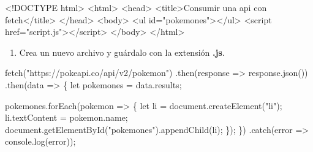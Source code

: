 \documentclass[
  a4paper,
  DIV=11,
  numbers=noendperiod,
  onepage,
  openany]{scrreprt}
\newenvironment{Shaded}{\begin{snugshade}}{\end{snugshade}}
\newcommand{\AttributeTok}[1]{\textcolor[rgb]{0.40,0.45,0.13}{#1}}
\newcommand{\BuiltInTok}[1]{\textcolor[rgb]{0.00,0.23,0.31}{#1}}
\newcommand{\DataTypeTok}[1]{\textcolor[rgb]{0.68,0.00,0.00}{#1}}
\newcommand{\FunctionTok}[1]{\textcolor[rgb]{0.28,0.35,0.67}{#1}}
\newcommand{\KeywordTok}[1]{\textcolor[rgb]{0.00,0.23,0.31}{#1}}
\newcommand{\NormalTok}[1]{\textcolor[rgb]{0.00,0.23,0.31}{#1}}
\newcommand{\OperatorTok}[1]{\textcolor[rgb]{0.37,0.37,0.37}{#1}}
\newcommand{\OtherTok}[1]{\textcolor[rgb]{0.00,0.23,0.31}{#1}}
\newcommand{\StringTok}[1]{\textcolor[rgb]{0.13,0.47,0.30}{#1}}
\providecommand{\tightlist}{%
  \setlength{\itemsep}{0pt}\setlength{\parskip}{0pt}}\usepackage{longtable,booktabs,array}
\begin{document}
\begin{Shaded}
\begin{Highlighting}[]
\DataTypeTok{\textless{}!DOCTYPE }\NormalTok{html}\DataTypeTok{\textgreater{}}
\DataTypeTok{\textless{}}\KeywordTok{html}\DataTypeTok{\textgreater{}}
\DataTypeTok{\textless{}}\KeywordTok{head}\DataTypeTok{\textgreater{}}
    \DataTypeTok{\textless{}}\KeywordTok{title}\DataTypeTok{\textgreater{}}\NormalTok{Consumir una api con fetch}\DataTypeTok{\textless{}/}\KeywordTok{title}\DataTypeTok{\textgreater{}}
\DataTypeTok{\textless{}/}\KeywordTok{head}\DataTypeTok{\textgreater{}}
\DataTypeTok{\textless{}}\KeywordTok{body}\DataTypeTok{\textgreater{}}
    \DataTypeTok{\textless{}}\KeywordTok{ul}\OtherTok{ id}\OperatorTok{=}\StringTok{"pokemones"}\DataTypeTok{\textgreater{}\textless{}/}\KeywordTok{ul}\DataTypeTok{\textgreater{}}
    \DataTypeTok{\textless{}}\KeywordTok{script}\OtherTok{ href}\OperatorTok{=}\StringTok{"script.js"}\DataTypeTok{\textgreater{}\textless{}/}\KeywordTok{script}\DataTypeTok{\textgreater{}}
\DataTypeTok{\textless{}/}\KeywordTok{body}\DataTypeTok{\textgreater{}}
\DataTypeTok{\textless{}/}\KeywordTok{html}\DataTypeTok{\textgreater{}}
\end{Highlighting}
\end{Shaded}

\begin{enumerate}
\def\labelenumi{\arabic{enumi}.}
\setcounter{enumi}{3}
\tightlist
\item
  Crea un nuevo archivo y guárdalo con la extensión \textbf{.js}.
\end{enumerate}

\begin{Shaded}
\begin{Highlighting}[]
\FunctionTok{fetch}\NormalTok{(}\StringTok{"https://pokeapi.co/api/v2/pokemon"}\NormalTok{)}
    \OperatorTok{.}\FunctionTok{then}\NormalTok{(response }\KeywordTok{=\textgreater{}}\NormalTok{ response}\OperatorTok{.}\FunctionTok{json}\NormalTok{())}
    \OperatorTok{.}\FunctionTok{then}\NormalTok{(data }\KeywordTok{=\textgreater{}}\NormalTok{ \{}
        \KeywordTok{let}\NormalTok{ pokemones }\OperatorTok{=}\NormalTok{ data}\OperatorTok{.}\AttributeTok{results}\OperatorTok{;}

\NormalTok{        pokemones}\OperatorTok{.}\FunctionTok{forEach}\NormalTok{(pokemon }\KeywordTok{=\textgreater{}}\NormalTok{ \{}
            \KeywordTok{let}\NormalTok{ li }\OperatorTok{=} \BuiltInTok{document}\OperatorTok{.}\FunctionTok{createElement}\NormalTok{(}\StringTok{"li"}\NormalTok{)}\OperatorTok{;}
\NormalTok{            li}\OperatorTok{.}\AttributeTok{textContent} \OperatorTok{=}\NormalTok{ pokemon}\OperatorTok{.}\AttributeTok{name}\OperatorTok{;}
            \BuiltInTok{document}\OperatorTok{.}\FunctionTok{getElementById}\NormalTok{(}\StringTok{"pokemones"}\NormalTok{)}\OperatorTok{.}\FunctionTok{appendChild}\NormalTok{(li)}\OperatorTok{;}
\NormalTok{        \})}\OperatorTok{;}
\NormalTok{    \})}
    \OperatorTok{.}\FunctionTok{catch}\NormalTok{(error }\KeywordTok{=\textgreater{}} \BuiltInTok{console}\OperatorTok{.}\FunctionTok{log}\NormalTok{(error))}\OperatorTok{;}
\end{Highlighting}
\end{Shaded}
\end{document}
